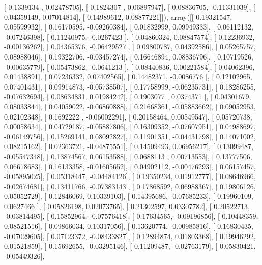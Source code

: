 \documentclass{article}
\begin{document}
       [ 0.1339134 ,  0.02478705],
       [ 0.1824307 ,  0.06897947],
       [ 0.08836705, -0.11331039],
       [ 0.04359149,  0.07014814],
       [ 0.14989612,  0.08877221]]), array([[ 0.19321547,  0.05599932],
       [ 0.16170595, -0.09260384],
       [ 0.01832999,  0.09949333],
       [ 0.06112132, -0.07246398],
       [ 0.11240975, -0.0267423 ],
       [ 0.04860324,  0.08847574],
       [ 0.12236932, -0.00136262],
       [ 0.04365376, -0.06429527],
       [ 0.09800787,  0.04392586],
       [ 0.05265757,  0.08988046],
       [ 0.19322706, -0.03457274],
       [ 0.16646894,  0.08836796],
       [ 0.10719526, -0.00635779],
       [ 0.05473862, -0.0641213 ],
       [ 0.08440836,  0.00221584],
       [ 0.04062396,  0.01438891],
       [ 0.07236332,  0.07402565],
       [ 0.14482371, -0.0086776 ],
       [ 0.12102965,  0.07401431],
       [ 0.09914873, -0.05738507],
       [ 0.17758999, -0.06235731],
       [ 0.18286255, -0.07632694],
       [ 0.08634831,  0.01984242],
       [ 0.1903077 ,  0.0374371 ],
       [ 0.04301679,  0.08033844],
       [ 0.04059022, -0.06860888],
       [ 0.21668361, -0.05883662],
       [ 0.09052953,  0.02102348],
       [ 0.1692222 , -0.06002291],
       [ 0.20158464,  0.00549547],
       [ 0.05720738,  0.00058634],
       [ 0.04729187, -0.05887806],
       [ 0.16309352, -0.07607951],
       [ 0.04988697, -0.06149756],
       [ 0.15269141,  0.08092827],
       [ 0.11901351, -0.04431798],
       [ 0.14071002,  0.08215162],
       [ 0.02363721, -0.04875551],
       [ 0.14509493,  0.06956217],
       [ 0.13099487, -0.05547348],
       [ 0.13874567,  0.06153588],
       [ 0.0688113 ,  0.00713553],
       [ 0.13777506,  0.06618683],
       [ 0.16133358, -0.01605652],
       [ 0.04902112, -0.00476293],
       [ 0.06157457, -0.05895025],
       [ 0.05318447, -0.04484126],
       [ 0.19350234,  0.01912777],
       [ 0.08646966, -0.02674681],
       [ 0.13411766, -0.07383143],
       [ 0.17868592,  0.06988367],
       [ 0.19806126,  0.05052729],
       [ 0.12846069,  0.10339103],
       [ 0.14395686, -0.07685233],
       [ 0.19960109,  0.0627466 ],
       [ 0.05826198,  0.02073765],
       [ 0.21302597,  0.03307782],
       [ 0.20522713, -0.03814495],
       [ 0.15852964, -0.07576418],
       [ 0.17634565, -0.09196856],
       [ 0.10448359,  0.08521516],
       [ 0.09866034,  0.10317056],
       [ 0.13620774, -0.00985816],
       [ 0.16830435, -0.07029605],
       [ 0.07123372, -0.08433827],
       [ 0.12894874,  0.01803368],
       [ 0.19946292,  0.01521859],
       [ 0.15692655, -0.03295146],
       [ 0.11209487, -0.02763179],
       [ 0.05830421, -0.05449326],
\end{document}
